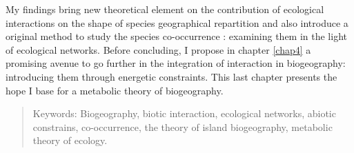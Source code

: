 My findings bring new theoretical element on the contribution of
ecological interactions on the shape of species geographical repartition
and also introduce a original method to study the species co-occurrence
: examining them in the light of ecological networks. Before concluding,
I propose in chapter \ref{chap4} a promising avenue to go further in the
integration of interaction in biogeography: introducing them through
energetic constraints. This last chapter presents the hope I base for a
metabolic theory of biogeography.

\begin{quote}
Keywords: Biogeography, biotic interaction, ecological networks, abiotic
constrains, co-occurrence, the theory of island biogeography, metabolic
theory of ecology.
\end{quote}
